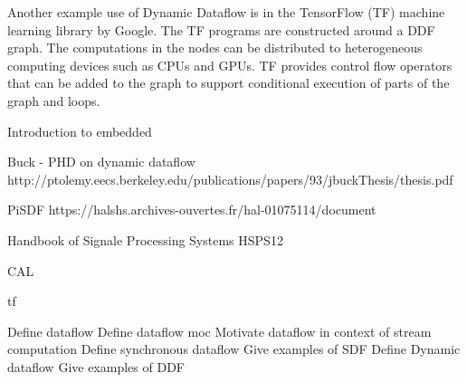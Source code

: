 Another example use of Dynamic Dataflow is in the TensorFlow (TF) machine learning library by Google. The TF programs are constructed around a DDF graph.  The computations in the nodes can be distributed to heterogeneous computing devices such as CPUs and GPUs. TF provides control flow operators that can be added to the graph to support conditional execution of parts of the graph and loops.

Introduction to embedded \cite{lee2015introduction}

Buck - PHD on dynamic dataflow http://ptolemy.eecs.berkeley.edu/publications/papers/93/jbuckThesis/thesis.pdf
\cite{buck1993scheduling}

PiSDF https://halshs.archives-ouvertes.fr/hal-01075114/document
\cite{desnos2013pimm}

Handbook of Signale Processing Systems HSPS12
\cite{bhattacharyya2013handbook}

CAL \cite{eker2003cal}

tf \cite{tensorflow2015-whitepaper}

Define dataflow
Define dataflow moc
Motivate dataflow in context of stream computation
Define synchronous dataflow
Give examples of SDF
Define Dynamic dataflow
Give examples of DDF

